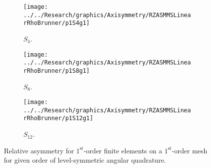 \documentclass[12pt]{article}
\begin{document}
\begin{sidewaysfigure}[!htb]
\centering
\begin{subfigure}{0.33\textwidth}
\texttt{[image: ../../Research/graphics/Axisymmetry/RZASMMSLinearRhoBrunner/p1S4g1]}
\caption{$S_4$.}
\end{subfigure}%
\begin{subfigure}{0.33\textwidth}
\texttt{[image: ../../Research/graphics/Axisymmetry/RZASMMSLinearRhoBrunner/p1S8g1]}
\caption{$S_8$.}
\end{subfigure}%
\begin{subfigure}{0.33\textwidth}
\texttt{[image: ../../Research/graphics/Axisymmetry/RZASMMSLinearRhoBrunner/p1S12g1]}
\caption{$S_{12}$.}
\end{subfigure}
\caption{Relative asymmetry for $1^\text{st}$-order finite elements on a $1^\text{st}$-order mesh for given order of level-symmetric angular quadrature.}
\label{fig:RZASMMSLinearRhoBrunnerp1g1}
\end{sidewaysfigure}
\end{document}
